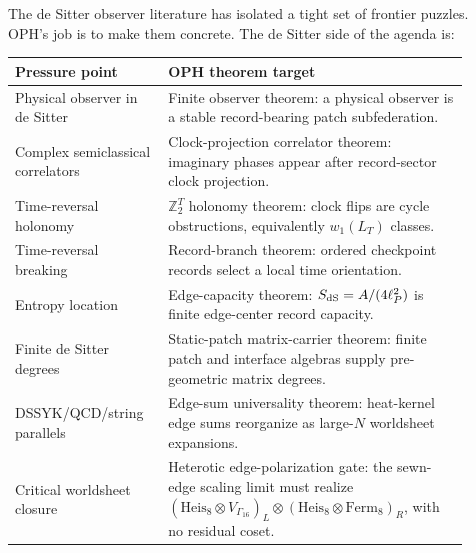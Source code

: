 \documentclass[11pt]{article}
\theoremstyle{remark}
\theoremstyle{plain}
\newcommand{\Z}{\mathbb Z}
\begin{document}
The de Sitter observer literature has isolated a tight set of frontier puzzles. OPH's job is to
make them concrete. The de Sitter side of the agenda is:
\begin{center}
\small
\begin{tabular}{p{0.29\linewidth}p{0.61\linewidth}}
\toprule
\textbf{Pressure point} & \textbf{OPH theorem target} \\
\midrule
Physical observer in de Sitter & Finite observer theorem: a physical observer is a stable
record-bearing patch subfederation. \\
Complex semiclassical correlators & Clock-projection correlator theorem: imaginary phases appear
after record-sector clock projection. \\
Time-reversal holonomy & \(\Z_2^T\) holonomy theorem: clock flips are cycle obstructions,
equivalently \(w_1(L_T)\) classes. \\
Time-reversal breaking & Record-branch theorem: ordered checkpoint records select a local time
orientation. \\
Entropy location & Edge-capacity theorem: \(S_{\rm dS}=A/(4\ell_P^2)\) is finite edge-center
record capacity. \\
Finite de Sitter degrees & Static-patch matrix-carrier theorem: finite patch and interface
algebras supply pre-geometric matrix degrees. \\
DSSYK/QCD/string parallels & Edge-sum universality theorem: heat-kernel edge sums reorganize as
large-\(N\) worldsheet expansions. \\
Critical worldsheet closure & Heterotic edge-polarization gate: the sewn-edge scaling limit must
realize \((\mathrm{Heis}_8\otimes V_{\Gamma_{16}})_L\otimes
(\mathrm{Heis}_8\otimes\mathrm{Ferm}_8)_R\), with no residual coset. \\
\bottomrule
\end{tabular}
\end{center}
\end{document}
